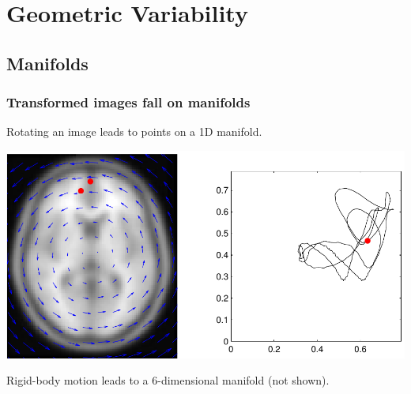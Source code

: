 \documentclass{beamer}
\begin{document}
\section{Geometric Variability}

\subsection{Manifolds}
\begin{frame}
\frametitle{Transformed images fall on manifolds}
Rotating an image leads to points on a 1D manifold.\par
\includegraphics[width=\textwidth]{manifold_rotation}

Rigid-body motion leads to a 6-dimensional manifold (not shown).

\end{frame}
\end{document}
